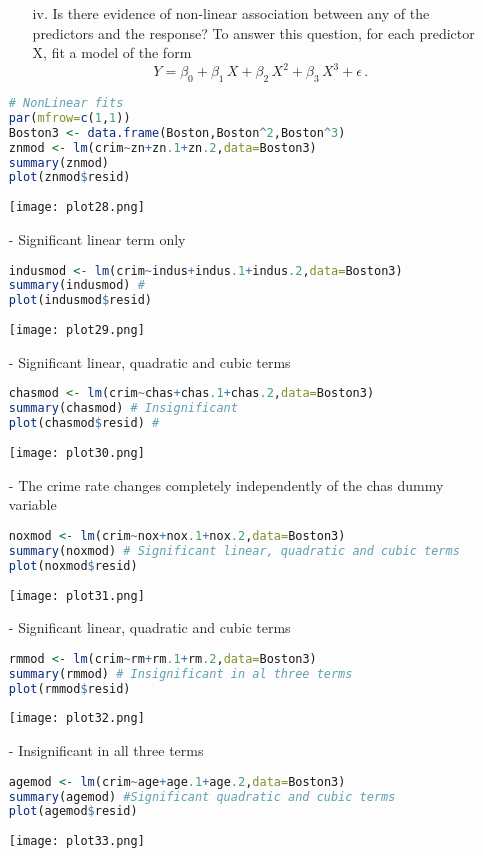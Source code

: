 \documentclass[11pt]{report}
\begin{document}
\begin{itemize}
\begin{itemize}
\item[iv. ] Is there evidence of non-linear association between any of the predictors and the response? To answer this question, for each predictor X, fit a model of the form
$$Y=\beta_0+\beta_1\,X+\beta_2\,X^2+\beta_3\,X^3+\epsilon\,.$$
\end{itemize}

\begin{lstlisting}[language=R]
# NonLinear fits
par(mfrow=c(1,1))
Boston3 <- data.frame(Boston,Boston^2,Boston^3)
znmod <- lm(crim~zn+zn.1+zn.2,data=Boston3)
summary(znmod)  
plot(znmod$resid)   
\end{lstlisting}
\texttt{[image: plot28.png]}
\item[-] Significant linear term only

\begin{lstlisting}[language=R]
indusmod <- lm(crim~indus+indus.1+indus.2,data=Boston3)
summary(indusmod) #
plot(indusmod$resid)
\end{lstlisting}
\texttt{[image: plot29.png]}

\item[-] Significant linear, quadratic and cubic terms
\begin{lstlisting}[language=R]
chasmod <- lm(crim~chas+chas.1+chas.2,data=Boston3)
summary(chasmod) # Insignificant
plot(chasmod$resid) # 
\end{lstlisting}
\texttt{[image: plot30.png]}

\item[-] The crime rate changes completely independently of the chas dummy variable
\begin{lstlisting}[language=R]
noxmod <- lm(crim~nox+nox.1+nox.2,data=Boston3)
summary(noxmod) # Significant linear, quadratic and cubic terms
plot(noxmod$resid)
\end{lstlisting}
\texttt{[image: plot31.png]}

\item[-] Significant linear, quadratic and cubic terms

\begin{lstlisting}[language=R]
rmmod <- lm(crim~rm+rm.1+rm.2,data=Boston3)
summary(rmmod) # Insignificant in al three terms
plot(rmmod$resid)
\end{lstlisting}
\texttt{[image: plot32.png]}

\item[-] Insignificant in all three terms

\begin{lstlisting}[language=R]
agemod <- lm(crim~age+age.1+age.2,data=Boston3)
summary(agemod) #Significant quadratic and cubic terms
plot(agemod$resid)
\end{lstlisting}
\texttt{[image: plot33.png]}


\end{itemize}
\end{document}
